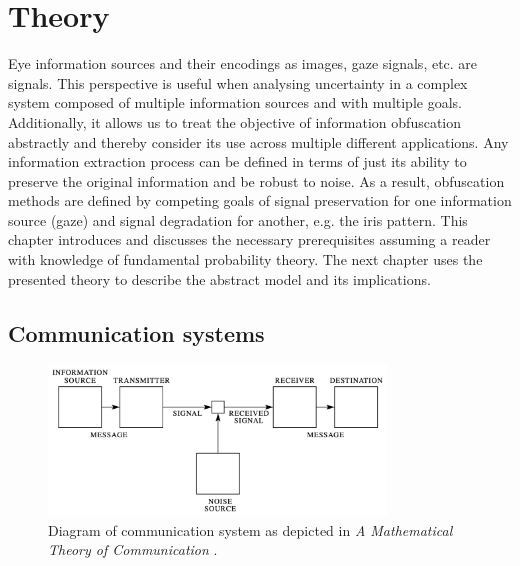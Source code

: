 \chapter{Theory}
Eye information sources and their encodings as images, gaze signals, etc. are signals. This perspective is useful when analysing uncertainty in a complex system composed of multiple information sources and with multiple goals. Additionally, it allows us to treat the objective of information obfuscation abstractly and thereby consider its use across multiple different applications. Any information extraction process can be defined in terms of just its ability to preserve the original information and be robust to noise. As a result, obfuscation methods are defined by competing goals of signal preservation for one information source (gaze) and signal degradation for another, e.g. the iris pattern. This chapter introduces and discusses the necessary prerequisites assuming a reader with knowledge of fundamental probability theory. The next chapter uses the presented theory to describe the abstract model and its implications.




\section{Communication systems}\label{sec:comm}
\begin{figure}
    \centering
    \includegraphics[width=0.8\textwidth]{figures/theory/comm-model.png}
    \caption{Diagram of communication system as depicted in \textit{A Mathematical Theory of Communication} \parencite{shannon1948mathematical}.}
    \label{fig:comm-model}
\end{figure}

